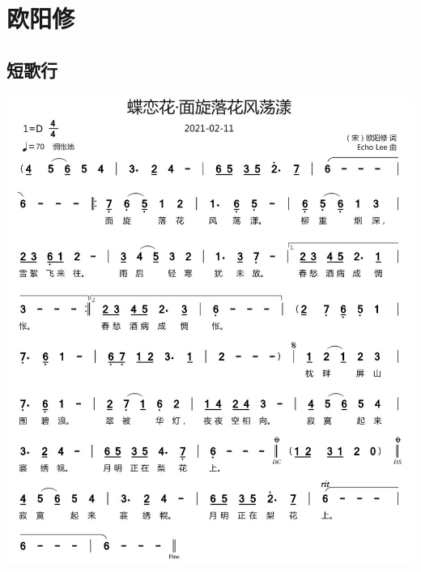 \documentclass[cn,pad,twocol]{elegantbook}
\begin{document}
\chapter{欧阳修}
\section{短歌行}    \includegraphics[width=\textwidth]{rpi400/20210212欧阳修-蝶恋花面旋落花风荡漾.jpg} 
\end{document}

